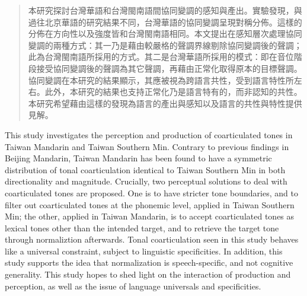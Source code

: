 
\begin{abstract}

本研究探討台灣華語和台灣閩南語間協同變調的感知與產出。實驗發現，與過往北京華語的研究結果不同，台灣華語的協同變調呈現對稱分佈。這樣的分佈在方向性以及強度皆和台灣閩南語相同。本文提出在感知層次處理協同變調的兩種方式：其一乃是藉由較嚴格的聲調界線剔除協同變調後的聲調；此為台灣閩南語所採用的方式。其二是台灣華語所採用的模式：即在音位階段接受協同變調後的聲調為其它聲調，再藉由正常化取得原本的目標聲調。
協同變調在本研究的結果顯示，其應被視為跨語言共性，受到語言特性所左右。此外，本研究的結果也支持正常化乃是語言特有的，而非認知的共性。本研究希望藉由這樣的發現為語言的產出與感知以及語言的共性與特性提供見解。

\end{abstract}

\begin{abstract*}

This study investigates the perception and production of coarticulated tones in Taiwan Mandarin and Taiwan Southern Min. Contrary to previous findings in Beijing Mandarin, Taiwan Mandarin has been found to have a symmetric distribution of tonal coarticulation identical to Taiwan Southern Min in both directionality and magnitude. Crucially, two perceptual solutions to deal with coarticulated tones are proposed. One is to have 
stricter tone boundaries, and to filter out coarticulated tones at the phonemic level, applied in Taiwan Southern Min; the other, applied in Taiwan Mandarin, is to accept coarticulated tones as lexical tones other than the intended target, and to retrieve the target tone through normaliztion afterwards. Tonal coarticulation seen in this study behaves like a universal constraint, subject to linguistic specificities. In addition, this study supports the idea that normalization is speech-specific, and not cognitive generality. This study hopes to shed light on the interaction of production and perception, as well as the issue of language universals and specificities.

\end{abstract*}